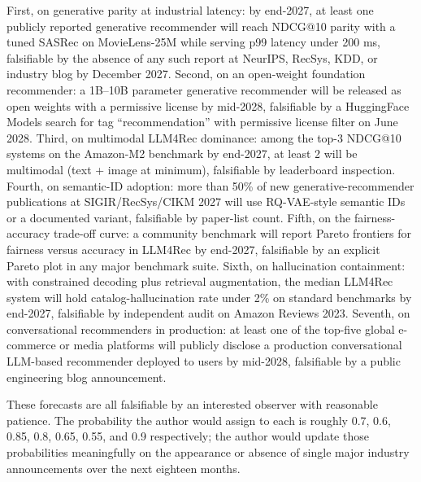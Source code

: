 First, on generative parity at industrial latency: by end-2027, at least one publicly reported generative recommender will reach NDCG@10 parity with a tuned SASRec on MovieLens-25M while serving p99 latency under 200 ms, falsifiable by the absence of any such report at NeurIPS, RecSys, KDD, or industry blog by December 2027. Second, on an open-weight foundation recommender: a 1B--10B parameter generative recommender will be released as open weights with a permissive license by mid-2028, falsifiable by a HuggingFace Models search for tag ``recommendation'' with permissive license filter on June 2028. Third, on multimodal LLM4Rec dominance: among the top-3 NDCG@10 systems on the Amazon-M2 benchmark by end-2027, at least 2 will be multimodal (text + image at minimum), falsifiable by leaderboard inspection. Fourth, on semantic-ID adoption: more than 50\% of new generative-recommender publications at SIGIR/RecSys/CIKM 2027 will use RQ-VAE-style semantic IDs or a documented variant, falsifiable by paper-list count. Fifth, on the fairness-accuracy trade-off curve: a community benchmark will report Pareto frontiers for fairness versus accuracy in LLM4Rec by end-2027, falsifiable by an explicit Pareto plot in any major benchmark suite. Sixth, on hallucination containment: with constrained decoding plus retrieval augmentation, the median LLM4Rec system will hold catalog-hallucination rate under 2\% on standard benchmarks by end-2027, falsifiable by independent audit on Amazon Reviews 2023. Seventh, on conversational recommenders in production: at least one of the top-five global e-commerce or media platforms will publicly disclose a production conversational LLM-based recommender deployed to users by mid-2028, falsifiable by a public engineering blog announcement.

These forecasts are all falsifiable by an interested observer with reasonable patience. The probability the author would assign to each is roughly 0.7, 0.6, 0.85, 0.8, 0.65, 0.55, and 0.9 respectively; the author would update those probabilities meaningfully on the appearance or absence of single major industry announcements over the next eighteen months.

